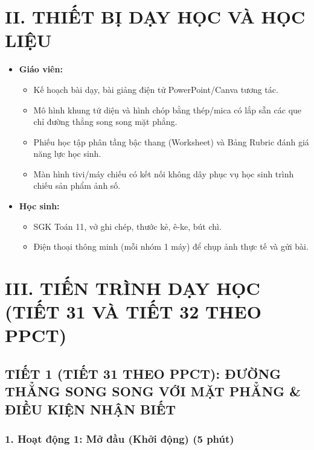 \documentclass[12pt, a4paper]{article}
\begin{document}
\section*{II. THIẾT BỊ DẠY HỌC VÀ HỌC LIỆU}

\begin{itemize}[leftmargin=1.2cm]
    \item \textbf{Giáo viên:}
    \begin{itemize}[leftmargin=0.6cm]
        \item Kế hoạch bài dạy, bài giảng điện tử PowerPoint/Canva tương tác.
        \item Mô hình khung tứ diện và hình chóp bằng thép/mica có lắp sẵn các que chỉ đường thẳng song song mặt phẳng.
        \item Phiếu học tập phân tầng bậc thang (Worksheet) và Bảng Rubric đánh giá năng lực học sinh.
        \item Màn hình tivi/máy chiếu có kết nối không dây phục vụ học sinh trình chiếu sản phẩm ảnh số.
    \end{itemize}
    \item \textbf{Học sinh:}
    \begin{itemize}[leftmargin=0.6cm]
        \item SGK Toán 11, vở ghi chép, thước kẻ, ê-ke, bút chì.
        \item Điện thoại thông minh (mỗi nhóm 1 máy) để chụp ảnh thực tế và gửi bài.
    \end{itemize}
\end{itemize}

\section*{III. TIẾN TRÌNH DẠY HỌC (TIẾT 31 VÀ TIẾT 32 THEO PPCT)}

\subsection*{TIẾT 1 (TIẾT 31 THEO PPCT): ĐƯỜNG THẲNG SONG SONG VỚI MẶT PHẲNG \& ĐIỀU KIỆN NHẬN BIẾT}

\subsubsection*{1. Hoạt động 1: Mở đầu (Khởi động) (5 phút)}
\end{document}
